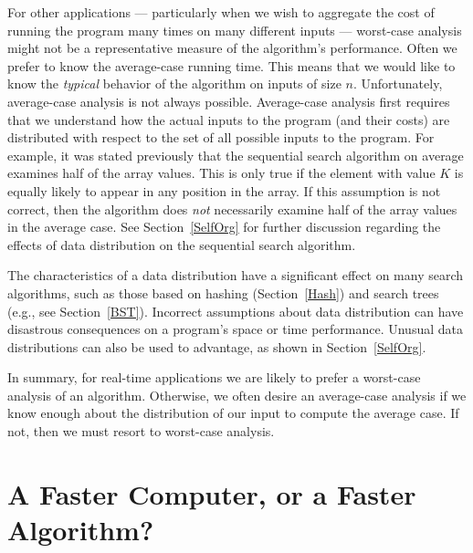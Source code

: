 For other applications --- particularly when we wish to aggregate the
cost of running the program many times on many different inputs ---
worst-case analysis might not be a representative measure of the
algorithm's performance.
Often we prefer to know the average-case running time.
This means that we would like to know the \emph{typical} behavior of
the algorithm on inputs of size \(n\).
Unfortunately, average-case analysis is not always possible.
Average-case analysis first requires that we understand how the actual
inputs to the program (and their costs) are distributed with respect
to the set of all possible inputs to the program.
For example, it was stated previously that the sequential search
algorithm on average examines half of the array values.
This is only true if the element with value \(K\) is
equally likely to appear in any position in the array.
If this assumption is not correct, then the algorithm does \emph{not}
necessarily examine half of the array values in the average case.
See Section~\ref{SelfOrg} for further discussion regarding the effects
of data distribution on the sequential search algorithm.

The characteristics of a data distribution have a significant effect
on many search algorithms, such as those based on
hashing (Section~\ref{Hash}) and search
trees (e.g., see Section~\ref{BST}).
Incorrect assumptions about data distribution can have disastrous
consequences on a program's space or time performance.
Unusual data distributions can also be used to advantage, as shown in
Section~\ref{SelfOrg}.

In summary, for real-time applications
we are likely to prefer a worst-case analysis of an algorithm.
Otherwise, we often desire an average-case analysis if we know enough
about the distribution of our input to compute the average case.
If not, then we must resort to worst-case analysis.

\section{A Faster Computer, or a Faster Algorithm?}


